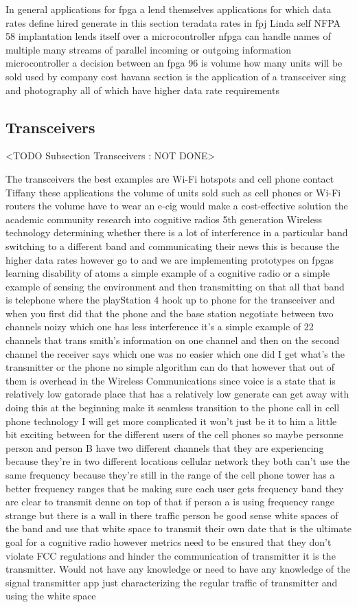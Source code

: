 In general applications for fpga a lend themselves applications for which data rates define hired generate in this section teradata rates in fpj Linda self NFPA 58 implantation lends itself over a microcontroller nfpga can handle names of multiple many streams of parallel incoming or outgoing information microcontroller a decision between an fpga 96 is volume how many units will be sold used by company cost havana section is the application of a transceiver sing and photography all of which have higher data rate requirements

\subsection{Transceivers}
	<TODO Subsection Transceivers : NOT DONE>

The transceivers the best examples are Wi-Fi hotspots and cell phone contact Tiffany these applications the volume of units sold such as cell phones or Wi-Fi routers the volume have to wear an e-cig would make a cost-effective solution the academic community research into cognitive radios 5th generation Wireless technology determining whether there is a lot of interference in a particular band switching to a different band and communicating their news this is because the higher data rates however go to and we are implementing prototypes on fpgas learning disability of atoms a simple example of a cognitive radio or a simple example of sensing the environment and then transmitting on that all that band is telephone where the playStation 4 hook up to phone for the transceiver and when you first did that the phone and the base station negotiate between two channels noizy which one has less interference it's a simple example of 22 channels that trans smith's information on one channel and then on the second channel the receiver says which one was no easier which one did I get what's the transmitter or the phone no simple algorithm can do that however that out of them is overhead in the Wireless Communications since voice is a state that is relatively low gatorade place that has a relatively low generate can get away with doing this at the beginning make it seamless transition to the phone call in cell phone technology I will get more complicated it won't just be it to him a little bit exciting between for the different users of the cell phones so maybe personne person and person B have two different channels that they are experiencing because they're in two different locations cellular network they both can't use the same frequency because they're still in the range of the cell phone tower has a better frequency ranges that be making sure each user gets frequency band they are clear to transmit denne on top of that if person a is using frequency range strange but there is a wall in there traffic person be good sense white spaces of the band and use that white space to transmit their own date that is the ultimate goal for a cognitive radio however metrics need to be ensured that they don't violate FCC regulations and hinder the communication of transmitter it is the transmitter. Would not have any knowledge or need to have any knowledge of the signal transmitter app just characterizing the regular traffic of transmitter and using the white space 